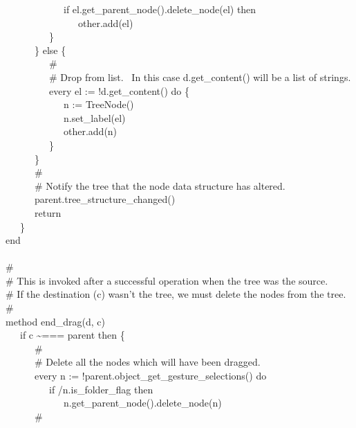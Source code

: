 {\>   \ \ \ \ \ \ \ \ \ \ \ \ if el.get\_parent\_node().delete\_node(el)
then \\
\>   \ \ \ \ \ \ \ \ \ \ \ \ \ \ \ other.add(el) \\
\>   \ \ \ \ \ \ \ \ \ \} \\
\>   \ \ \ \ \ \ \} else \{ \\
\>   \ \ \ \ \ \ \ \ \ \# \\
\>   \ \ \ \ \ \ \ \ \ \# Drop from list. \ In this case d.get\_content() will be a list of strings. \\
\>   \ \ \ \ \ \ \ \ \ every el := !d.get\_content() do \{ \\
\>   \ \ \ \ \ \ \ \ \ \ \ \ n := TreeNode() \\
\>   \ \ \ \ \ \ \ \ \ \ \ \ n.set\_label(el) \\
\>   \ \ \ \ \ \ \ \ \ \ \ \ other.add(n) \\
\>   \ \ \ \ \ \ \ \ \ \} \\
\>   \ \ \ \ \ \ \} \\
\>   \ \ \ \ \ \ \# \\
\>   \ \ \ \ \ \ \# Notify the tree that the node data structure has altered. \\
\>   \ \ \ \ \ \ parent.tree\_structure\_changed() \\
\>   \ \ \ \ \ \ return \\
\>   \ \ \ \} \\
\>   end \\
\ \\
\>   \# \\
\>   \# This is invoked after a successful operation when the tree was the source.\\
\>   \# If the destination (c) wasn't the tree, we must delete the nodes from the tree. \\
\>   \# \\
\>   method end\_drag(d, c) \\
\>   \ \ \ if c \~{}=== parent then \{ \\
\>   \ \ \ \ \ \ \# \\
\>   \ \ \ \ \ \ \# Delete all the nodes which will have been dragged. \\
\>   \ \ \ \ \ \ every n := !parent.object\_get\_gesture\_selections() do \\
\>   \ \ \ \ \ \ \ \ \ if /n.is\_folder\_flag then \\
\>   \ \ \ \ \ \ \ \ \ \ \ \ n.get\_parent\_node().delete\_node(n) \\
\>   \ \ \ \ \ \ \# \\
}
